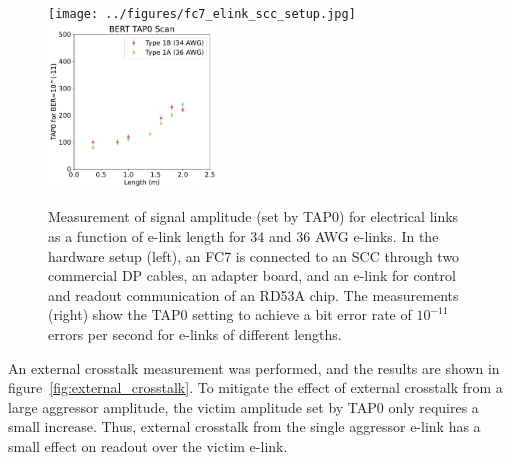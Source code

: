 \documentclass[a4paper,11pt]{article}
\begin{document}
\begin{figure}[htbp]
\centering
\texttt{[image: ../figures/fc7\_elink\_scc\_setup.jpg]}
\qquad
\includegraphics[width=0.4\textwidth,origin=c]{../figures/BERT_TAP0_vs_Length.pdf}
\caption{
\label{fig:tap0_vs_length}
Measurement of signal amplitude (set by TAP0) for electrical links as a function of e-link length for 34 and 36 AWG e-links.
In the hardware setup (left), an FC7 is connected to an SCC through two commercial DP cables, an adapter board, and an e-link for control and readout communication of an RD53A chip.
The measurements (right) show the TAP0 setting to achieve a bit error rate of $10^{-11}$ errors per second for e-links of different lengths.
}
\end{figure}


An external crosstalk measurement was performed, and the results are shown in figure~\ref{fig:external_crosstalk}.
To mitigate the effect of external crosstalk from a large aggressor amplitude, the victim amplitude set by TAP0 only requires a small increase.
Thus, external crosstalk from the single aggressor e-link has a small effect on readout over the victim e-link.
\end{document}
